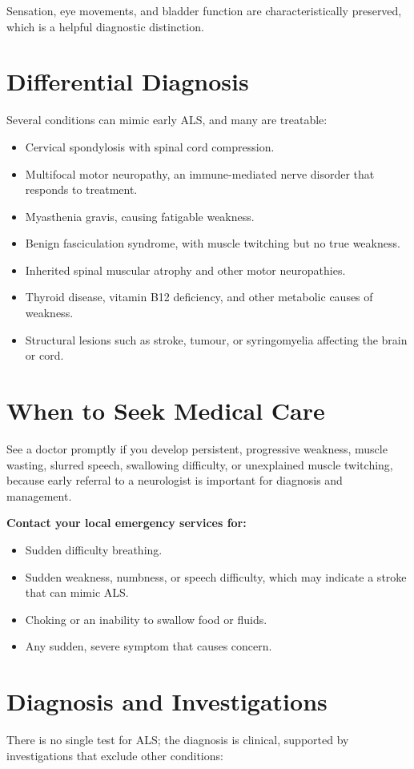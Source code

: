 Sensation, eye movements, and bladder function are characteristically preserved, which is a helpful diagnostic distinction.

\section*{Differential Diagnosis}
Several conditions can mimic early ALS, and many are treatable:

\begin{itemize}
    \item Cervical spondylosis with spinal cord compression.
    \item Multifocal motor neuropathy, an immune-mediated nerve disorder that responds to treatment.
    \item Myasthenia gravis, causing fatigable weakness.
    \item Benign fasciculation syndrome, with muscle twitching but no true weakness.
    \item Inherited spinal muscular atrophy and other motor neuropathies.
    \item Thyroid disease, vitamin B12 deficiency, and other metabolic causes of weakness.
    \item Structural lesions such as stroke, tumour, or syringomyelia affecting the brain or cord.
\end{itemize}

\section*{When to Seek Medical Care}
See a doctor promptly if you develop persistent, progressive weakness, muscle wasting, slurred speech, swallowing difficulty, or unexplained muscle twitching, because early referral to a neurologist is important for diagnosis and management.

\textbf{Contact your local emergency services for:}
\begin{itemize}
    \item Sudden difficulty breathing.
    \item Sudden weakness, numbness, or speech difficulty, which may indicate a stroke that can mimic ALS.
    \item Choking or an inability to swallow food or fluids.
    \item Any sudden, severe symptom that causes concern.
\end{itemize}

\section*{Diagnosis and Investigations}
There is no single test for ALS; the diagnosis is clinical, supported by investigations that exclude other conditions:

